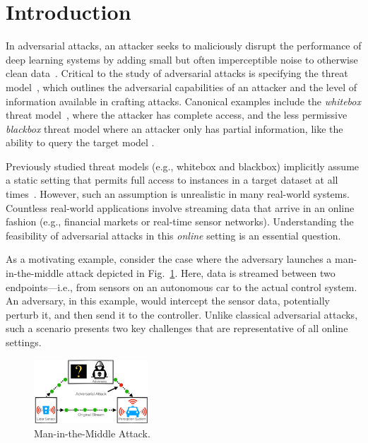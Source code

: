 \section{Introduction}


In adversarial attacks, an attacker seeks to maliciously disrupt the performance of deep learning systems by adding small but often imperceptible noise to otherwise clean data~\citep{szegedy2013intriguing,goodfellow2014explaining}. Critical to the study of adversarial attacks is specifying the threat model~\cite{akhtar2018threat}, which outlines the adversarial capabilities of an attacker and the level of information available in crafting attacks. Canonical examples include the \textit{whitebox} threat model~\cite{madry2017towards}, where the attacker has complete access, and the less permissive \textit{blackbox} threat model where an attacker only has partial information, like the ability to query the target model \citep{chen2017zoo,ilyas2017query,papernot2016transferability}. 

Previously studied threat models (e.g., whitebox and blackbox) implicitly assume a static setting that permits full access to instances in a target dataset at all times~\citep{tramer2017ensemble}. However, such an assumption is unrealistic in many real-world systems. Countless real-world applications involve streaming data that arrive in an online fashion (e.g., financial markets or real-time sensor networks). Understanding the feasibility of adversarial attacks in this {\em online} setting is an essential question. 

As a motivating example, consider the case where the adversary launches a man-in-the-middle attack depicted in Fig.~\ref{fig:man_in_the_middle}. Here, data is streamed between two endpoints---i.e., from sensors on an autonomous car to the actual control system. 
An adversary, in this example, would intercept the sensor data, potentially perturb it, and then send it to the controller. Unlike classical adversarial attacks, such a scenario presents two key challenges that are representative of all online settings. 

\begin{figure}
  \vspace{-8pt}
    \includegraphics[width=0.38\textwidth]{Figures/man_in_the_middle_attack_2.pdf}
  \vspace{-2pt}
\caption{Man-in-the-Middle Attack.}
\label{fig:man_in_the_middle}
\end{figure}

